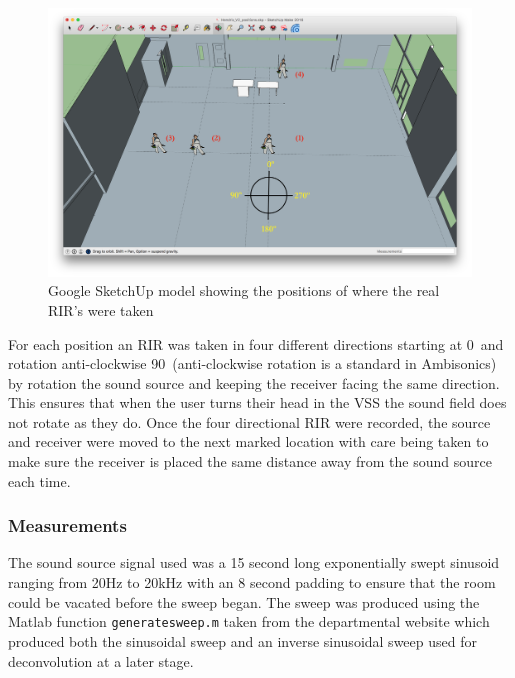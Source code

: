 \documentclass[../../main.tex]{subfiles}
\begin{document}
		\begin{figure}[H]
			\begin{center}
				\includegraphics[scale = 0.3]{Sections/Implementation/RealRIRs/images/Real_RIRs7_editV2.png} 
				\caption{Google SketchUp model showing the positions of where the real \ac{RIR}'s were taken}
				\label{rirPositions}
			\end{center}
		\end{figure}

	For each position an \ac{RIR} was taken in four different directions  starting at 0\textdegree~and rotation anti-clockwise 90\textdegree~(anti-clockwise rotation is a standard in Ambisonics) by rotation the sound source and keeping the receiver facing the same direction. This ensures that when the user turns their head in the \ac{VSS} the sound field does not rotate as they do. Once the four directional \ac{RIR} were recorded, the source and receiver were moved to the next marked location with care being taken to make sure the receiver is placed the same distance away from the sound source each time.

	\subsubsection{Measurements}
		The sound source signal used was a 15 second long exponentially swept sinusoid ranging from 20Hz to 20kHz with an 8 second padding to ensure that the room could be vacated before the sweep began. The sweep was produced using the Matlab function \texttt{generatesweep.m} taken from the departmental website \cite{sineSweep} which produced both the sinusoidal sweep and an inverse sinusoidal sweep used for deconvolution at a later stage.
		
\end{document}
